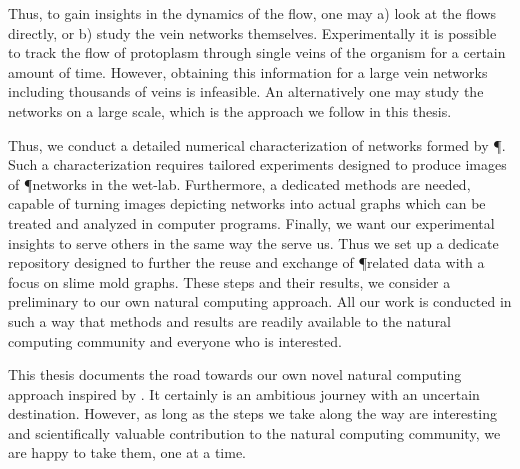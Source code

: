 	Thus, to gain insights in the dynamics of the flow, one may a) look at the flows directly, or b) study the vein networks themselves. Experimentally it is possible to track the flow of protoplasm through single veins of the organism for a certain amount of time. However, obtaining this information for a large vein networks including thousands of veins is infeasible. An alternatively one may study the networks on a large scale, which is the approach we follow in this thesis. 

	Thus, we conduct a detailed numerical characterization of networks formed by \P. Such a characterization requires tailored experiments designed to produce images of \P networks in the wet-lab. Furthermore, a dedicated methods are needed, capable of turning images depicting networks into actual graphs which can be treated and analyzed in computer programs. Finally, we want our experimental insights to serve others in the same way the serve us. Thus we set up a dedicate repository designed to further the reuse and exchange of \P related data with a focus on slime mold graphs. These steps and their results, we consider a preliminary to our own natural computing approach. All our work is conducted in such a way that methods and results are readily available to the  natural computing community and everyone who is interested. 

	This thesis documents the road towards our own novel natural computing approach inspired by \Pp. It certainly is an ambitious journey with an uncertain destination. However, as long as the steps we take along the way are interesting and scientifically valuable contribution to the natural computing community, we are happy to take them, one at a time.












